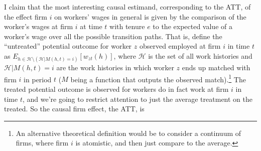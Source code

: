 \documentclass{article}
\begin{document}






I claim that the most interesting causal estimand, corresponding to the ATT, of the effect firm $i$ on workers' wages in general is given by the comparison of the worker's wages at firm $i$ at time $t$ with tenure $e$ to the expected value of a worker's wage over all the possible transition paths. That is, define the ``untreated'' potential outcome for worker $z$ observed employed at firm $i$ in time $t$ as $E_{h \in \mathcal{H} \setminus (\mathcal{H} | M(h,t) = i)}[w_{zt}(h)]$, where $\mathcal{H}$ is the set of all work histories and $\mathcal{H} | M(h,t) = i$ are the work histories in which worker $z$ ends up matched with firm $i$ in period $t$ ($M$ being a function that outputs the observed match).\footnote{An alternative theoretical definition would be to consider a continuum of firms, where firm $i$ is atomistic, and then just compare to the average.} The treated potential outcome is observed for workers do in fact work at firm $i$ in time $t$, and we're going to restrict attention to just the average treatment on the treated. So the causal firm effect, the ATT, is
\end{document}
